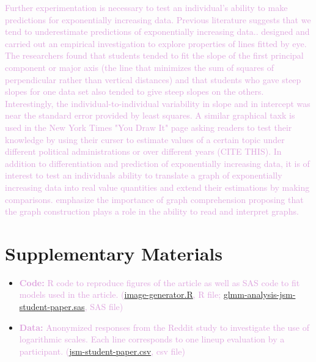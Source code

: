 \documentclass[]{interact}
\theoremstyle{plain}%
\theoremstyle{definition}
\theoremstyle{remark}
\begin{document}
\textcolor{Plum}{
Further experimentation is necessary to test an individual's ability to make predictions for exponentially increasing data. 
Previous literature suggests that we tend to underestimate predictions of exponentially increasing data.\citep{jones_generalized_1979, jones_polynomial_1977, wagenaar_extrapolation_1978}.
\citep{mosteller_eye_1981} designed and carried out an empirical investigation to explore properties of lines fitted by eye.
The researchers found that students tended to fit the slope of the first principal component or major axis (the line that minimizes the sum of squares of perpendicular rather than vertical distances) and that students who gave steep slopes for one data set also tended to give steep slopes on the others. 
Interestingly, the individual-to-individual variability in slope and in intercept was near the standard error provided by least squares.
A similar graphical taxk is used in the New York Times "You Draw It" page asking readers to test their knowledge by using their curser to estimate values of a certain topic under different political administrations or over different years (CITE THIS).
In addition to differentiation and prediction of exponentially increasing data, it is of interest to test an individuals ability to translate a graph of exponentially increasing data into real value quantities and extend their estimations by making comparisons. 
\citep{friel_making_2001} emphasize the importance of graph comprehension proposing that the graph construction plays a role in the ability to read and interpret graphs.
}

\hypertarget{supplementary-materials}{%
\section*{Supplementary Materials}\label{supplementary-materials}}

\begin{itemize}
\item
  \textcolor{Plum}{\textbf{Code:} R code to reproduce figures of the article as well as SAS code to fit models used in the article. (\href{https://github.com/srvanderplas/Perception-of-Log-Scales/blob/master/manuscripts/jsm-2021-student-paper-submission/code/image-generator.R}{image-generator.R}, R file; \href{https://github.com/srvanderplas/Perception-of-Log-Scales/blob/master/lineups-pilot-analysis/sasCode/glmm-analysis-jsm-student-paper.sas}{glmm-analysis-jsm-student-paper.sas}, SAS file)}
\item
  \textcolor{Plum}{\textbf{Data:} Anonymized responses from the Reddit study to investigate the use of logarithmic scales. Each line corresponds to one lineup evaluation by a participant. (\href{https://github.com/srvanderplas/Perception-of-Log-Scales/blob/master/lineups-pilot-analysis/data/jsm-student-paper-11302020.csv}{jsm-student-paper.csv}, csv file)}
\end{itemize}
\end{document}
